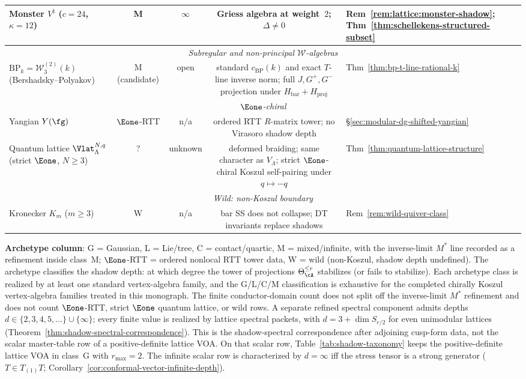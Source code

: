 \begin{table}[ht]
{{\begin{tabular}{|l|c|c|c|l|}
\hline
Monster $V^\natural$ ($c = 24$, $\kappa = 12$) & M & $\infty$ & Griess algebra at weight~$2$; $\Delta \neq 0$ & Rem~\ref{rem:lattice:monster-shadow}; Thm~\ref{thm:schellekens-structured-subset} \\
\hline
\multicolumn{5}{|c|}{\textit{Subregular and non-principal $\mathcal{W}$-algebras}} \\
\hline
$\mathrm{BP}_k = \mathcal{W}_3^{(2)}(k)$ (Bershadsky--Polyakov) & M (candidate) & open & standard $c_{\mathrm{BP}}(k)$ and exact $T$-line inverse norm; full $J,G^+,G^-$ projection under $H_{\mathrm{bar}}+H_{\mathrm{proj}}$ & Thm~\ref{thm:bp-t-line-rational-k} \\
\hline
\multicolumn{5}{|c|}{\textit{$\Eone$-chiral}} \\
\hline
Yangian $Y(\fg)$ & $\Eone$-RTT & n/a & ordered RTT $R$-matrix tower; no Virasoro shadow depth & \S\ref{sec:modular-dg-shifted-yangian} \\
\hline
Quantum lattice $\Vlat_\Lambda^{N,q}$ (strict $\Eone$, $N \geq 3$) & ? & unknown & deformed braiding; same character as $V_\Lambda$; strict $\Eone$-chiral Koszul self-pairing under $q\mapsto -q$ & Thm~\ref{thm:quantum-lattice-structure} \\
\hline
\multicolumn{5}{|c|}{\textit{Wild: non-Koszul boundary}} \\
\hline
Kronecker $K_m$ ($m \geq 3$) & W & n/a & bar SS does not collapse; DT invariants replace shadows & Rem~\ref{rem:wild-quiver-class} \\
\hline
\end{tabular}%
}%
}%
\end{table}

\noindent
\textbf{Archetype column}: G = Gaussian, L = Lie/tree, C = contact/quartic,
M = mixed/infinite, with the inverse-limit $M^*$ line recorded as a
refinement inside class~M; $\Eone$-RTT = ordered nonlocal RTT tower
data, W = wild (non-Koszul, shadow depth undefined).
The archetype classifies the shadow depth: at which
degree the tower of projections $\Theta_\cA^{\leq r}$ stabilizes (or
fails to stabilize). Each archetype class is realized by at least one
standard vertex-algebra family, and the G/L/C/M classification is
exhaustive for the completed chirally Koszul vertex-algebra families
treated in this monograph. The finite conductor-domain count does not
split off the inverse-limit $M^*$ refinement and does not count
$\Eone$-RTT, strict $\Eone$ quantum lattice, or wild rows. A separate
refined spectral component admits depths
$d \in \{2,3,4,5,\dotsc\} \cup \{\infty\}$; every finite value is
realized by lattice spectral packets, with
$d = 3 + \dim S_{r/2}$ for even unimodular lattices
(Theorem~\ref{thm:shadow-spectral-correspondence}). This is the
shadow-spectral correspondence after adjoining cusp-form data, not the
scalar master-table row of a positive-definite lattice VOA. On that
scalar row, Table~\ref{tab:shadow-taxonomy} keeps the positive-definite
lattice VOA in class~G with $r_{\max}=2$. The infinite scalar row is
characterized by $d = \infty$ iff the stress tensor is a strong
generator ($T \in T_{(1)}T$;
Corollary~\ref{cor:conformal-vector-infinite-depth}).

